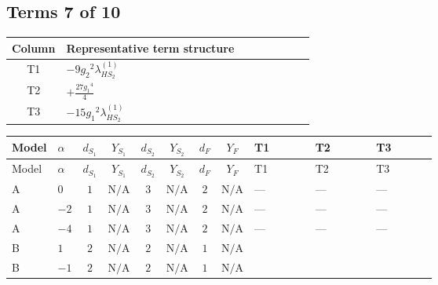 \documentclass[8pt]{article}
\begin{document}
\begin{landscape}
\subsection*{Terms 7 of 10}
\begin{center}
\begin{tabular}{@{}c >{\raggedright\arraybackslash}p{0.82\linewidth}@{}}
\toprule
Column & Representative term structure \\
\midrule
T1 & \(\displaystyle -9 {g_2}^2 {\lambda_{HS_2}^{(1)}}\) \\
\midrule
T2 & \(\displaystyle +\frac{27 {g_1}^4}{4}\) \\
\midrule
T3 & \(\displaystyle -15 {g_1}^2 {\lambda_{HS_2}^{(1)}}\) \\
\midrule
\bottomrule
\end{tabular}
\end{center}
\smallskip
\tiny
\begin{longtable}{@{}llcccccc >{\raggedright\arraybackslash}p{0.21\linewidth} >{\raggedright\arraybackslash}p{0.21\linewidth} >{\raggedright\arraybackslash}p{0.21\linewidth}@{}}
\toprule
Model & $\alpha$ & $d_{S_1}$ & $Y_{S_1}$ & $d_{S_2}$ & $Y_{S_2}$ & $d_F$ & $Y_F$ & T1 & T2 & T3 \\
\midrule
\endfirsthead
\toprule
Model & $\alpha$ & $d_{S_1}$ & $Y_{S_1}$ & $d_{S_2}$ & $Y_{S_2}$ & $d_F$ & $Y_F$ & T1 & T2 & T3 \\
\midrule
\endhead
A & $0$ & $1$ & $\text{N/A}$ & $3$ & $\text{N/A}$ & $2$ & $\text{N/A}$ & --- & --- & --- \\
\midrule
A & $-2$ & $1$ & $\text{N/A}$ & $3$ & $\text{N/A}$ & $2$ & $\text{N/A}$ & --- & --- & --- \\
\midrule
A & $-4$ & $1$ & $\text{N/A}$ & $3$ & $\text{N/A}$ & $2$ & $\text{N/A}$ & --- & --- & --- \\
\midrule
B & $1$ & $2$ & $\text{N/A}$ & $2$ & $\text{N/A}$ & $1$ & $\text{N/A}$ & \scriptsize\adjustbox{max width=\linewidth}{$\begin{gathered} -9 {g_2}^2 {\lambda_{HS_2}^{(1)}}\end{gathered}$} & \scriptsize\adjustbox{max width=\linewidth}{$\begin{gathered} +\frac{27 {g_1}^4}{4}\end{gathered}$} & \scriptsize\adjustbox{max width=\linewidth}{$\begin{gathered} -15 {g_1}^2 {\lambda_{HS_2}^{(1)}}\end{gathered}$} \\
\midrule
B & $-1$ & $2$ & $\text{N/A}$ & $2$ & $\text{N/A}$ & $1$ & $\text{N/A}$ & \scriptsize\adjustbox{max width=\linewidth}{$\begin{gathered} -9 {g_2}^2 {\lambda_{HS_2}^{(1)}}\end{gathered}$} & \scriptsize\adjustbox{max width=\linewidth}{$\begin{gathered} +\frac{3 {g_1}^4}{4}\end{gathered}$} & \scriptsize\adjustbox{max width=\linewidth}{$\begin{gathered} -3 {g_1}^2 {\lambda_{HS_2}^{(1)}}\end{gathered}$} \\

\end{longtable}
\end{landscape}
\end{document}
